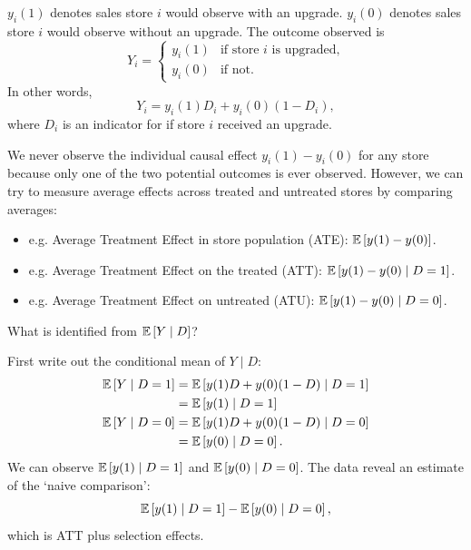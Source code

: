 \begin{example}
	$y_i(1)$ denotes sales store $i$ would observe with an upgrade. $y_i(0)$ denotes sales store $i$ would observe without an upgrade. The outcome observed is
	\[
		Y_i =
		\begin{cases}
			y_i(1) & \text{if store $i$ is upgraded,} \\
			y_i(0) & \text{if not.}
		\end{cases}
	\]
	In other words,
	\[
		Y_i = y_i(1)D_i + y_i(0)\left(1-D_i\right)
	,\]
	where $D_i$ is an indicator for if store $i$ received an upgrade.

	We never observe the individual causal effect $y_i(1)-y_i(0)$ for any store because only one of the two potential outcomes is ever observed. However, we can try to measure average effects across treated and untreated stores by comparing averages:
	\begin{itemize}
		\item e.g. Average Treatment Effect in store population (ATE): $\mathbb{E}\left[y(1)-y(0)\right]$.
		\item e.g. Average Treatment Effect on the treated (ATT): $\mathbb{E}\left[y(1)-y(0) \mid D=1\right]$.
		\item e.g. Average Treatment Effect on untreated (ATU): $\mathbb{E}\left[y(1)-y(0) \mid D=0\right]$.
	\end{itemize}

	What is identified from $\mathbb{E}\left[Y \mid D\right]$?

	First write out the conditional mean of $Y \mid D$:
	\begin{align*}
		\mathbb{E}\left[Y \mid D=1\right] &= \mathbb{E}\left[y(1)D + y(0)(1-D) \mid D=1\right] \\
		&= \mathbb{E}\left[y(1) \mid D=1\right] \\
		\mathbb{E}\left[Y \mid D=0\right] &= \mathbb{E}\left[y(1)D + y(0)(1-D) \mid D=0\right] \\
		&= \mathbb{E}\left[y(0) \mid D=0\right]
	.\end{align*}
	We can observe $\mathbb{E}\left[y(1) \mid D=1\right]$ and $\mathbb{E}\left[y(0) \mid D=0\right]$. The data reveal an estimate of the `naive comparison':
	\[
		\mathbb{E}\left[y(1) \mid D=1\right] - \mathbb{E}\left[y(0) \mid D=0\right]
	,\]
	which is ATT plus selection effects.
\end{example}

